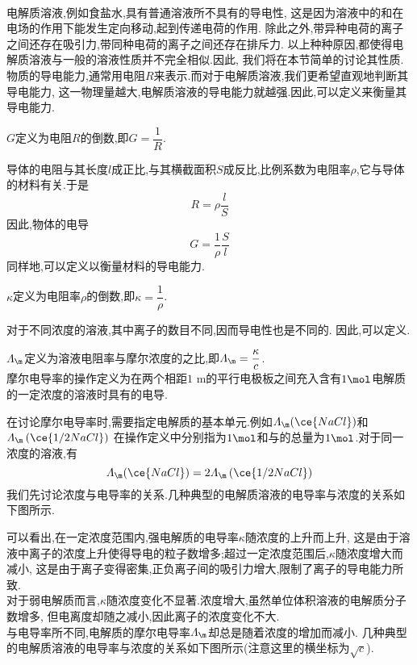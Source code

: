 \documentclass{ctexart}
\begin{document}
\pagestyle{plain}
\noindent{}\vspace{15pt}\\
\indent 电解质溶液,例如食盐水,具有普通溶液所不具有的导电性,%
这是因为溶液中的和在电场的作用下能发生定向移动,起到传递电荷的作用.%
除此之外,带异种电荷的离子之间还存在吸引力,带同种电荷的离子之间还存在排斥力.%
以上种种原因,都使得电解质溶液与一般的溶液性质并不完全相似.因此,%
我们将在本节简单的讨论其性质.\vspace{12pt}\\
\indent 物质的导电能力,通常用电阻$R$来表示.而对于电解质溶液,我们更希望直观地判断其导电能力,%
这一物理量越大,电解质溶液的导电能力就越强.因此,可以定义来衡量其导电能力.
\begin{definition}[6A.1.1 电导]
    $G$定义为电阻$R$的倒数,即$G=\dfrac1R$.
\end{definition}
导体的电阻与其长度$l$成正比,与其横截面积$S$成反比,比例系数为电阻率$\rho$,它与导体的材料有关.于是
\[R=\rho\dfrac{l}{S}\]
因此,物体的电导
\[G=\dfrac{1}{\rho}\dfrac{S}{l}\]
同样地,可以定义以衡量材料的导电能力.
\begin{definition}[6A.1.2 电导率]
    $\kappa$定义为电阻率$\rho$的倒数,即$\kappa=\dfrac{1}{\rho}$.
\end{definition}
对于不同浓度的溶液,其中离子的数目不同,因而导电性也是不同的.%
因此,可以定义.
\begin{definition}[6A.1.3 摩尔电导率]
    $\varLambda_\m$定义为溶液电阻率与摩尔浓度的之比,即$\varLambda_\m=\dfrac{\kappa}{c}$.\\
    摩尔电导率的操作定义\footnotemark 为在两个相距$1\text{ m}$的平行电极板之间充入含有$1\mol$电解质的一定浓度的溶液时具有的电导.
\end{definition}
在讨论摩尔电导率时,需要指定电解质的基本单元.例如$\varLambda_\m(\ce{NaCl})$和$\displaystyle\varLambda_\m\left(\ce{1/2NaCl}\right)$%
在操作定义中分别指为$1\mol$和与的总量为$1\mol$.对于同一浓度的溶液,有
\[\varLambda_\m(\ce{NaCl})=2\varLambda_\m\left(\ce{1/2NaCl}\right)\]
\indent 我们先讨论浓度与电导率的关系.几种典型的电解质溶液的电导率与浓度的关系如下图所示.
\begin{tightcenter}
    
\end{tightcenter}
可以看出,在一定浓度范围内,强电解质的电导率$\kappa$随浓度的上升而上升,%
这是由于溶液中离子的浓度上升使得导电的粒子数增多;超过一定浓度范围后,$\kappa$随浓度增大而减小,%
这是由于离子变得密集,正负离子间的吸引力增大,限制了离子的导电能力所致.\\
\indent 对于弱电解质而言,$\kappa$随浓度变化不显著.浓度增大,虽然单位体积溶液的电解质分子数增多,%
但电离度却随之减小,因此离子的浓度变化不大.\\
\indent 与电导率所不同,电解质的摩尔电导率$\varLambda_\m$却总是随着浓度的增加而减小.%
几种典型的电解质溶液的电导率与浓度的关系如下图所示(注意这里的横坐标为$\sqrt{c}$).
\begin{tightcenter}
    
\end{tightcenter}
\end{document}

